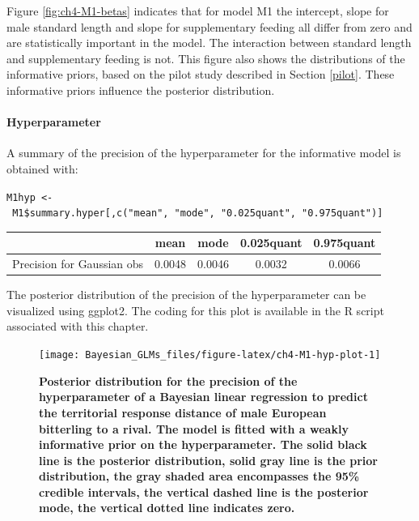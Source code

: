 \documentclass[
]{book}
\begin{document}
Figure \ref{fig:ch4-M1-betas} indicates that for model M1 the intercept, slope for male standard length and slope for supplementary feeding all differ from zero and are statistically important in the model. The interaction between standard length and supplementary feeding is not. This figure also shows the distributions of the informative priors, based on the pilot study described in Section \ref{pilot}. These informative priors influence the posterior distribution.

\hypertarget{hyperparameter-1}{%
\paragraph{Hyperparameter}\label{hyperparameter-1}}

A summary of the precision of the hyperparameter for the informative model is obtained with:

\texttt{M1hyp\ \textless{}-\ M1\$summary.hyper{[},c("mean",\ "mode",\ "0.025quant",\ "0.975quant"){]}}

\begin{longtable}[]{@{}ccccc@{}}
\toprule
& mean & mode & 0.025quant & 0.975quant \\
\midrule
\endhead
Precision for Gaussian obs & 0.0048 & 0.0046 & 0.0032 & 0.0066 \\
\bottomrule
\end{longtable}

The posterior distribution of the precision of the hyperparameter can be visualized using ggplot2. The coding for this plot is available in the R script associated with this chapter.



\begin{figure}

{\centering \texttt{[image: Bayesian\_GLMs\_files/figure-latex/ch4-M1-hyp-plot-1]} 

}

\caption{\textbf{Posterior distribution for the precision of the hyperparameter of a Bayesian linear regression to predict the territorial response distance of male European bitterling to a rival. The model is fitted with a weakly informative prior on the hyperparameter. The solid black line is the posterior distribution, solid gray line is the prior distribution, the gray shaded area encompasses the 95\% credible intervals, the vertical dashed line is the posterior mode, the vertical dotted line indicates zero.}}\label{fig:ch4-M1-hyp-plot}
\end{figure}
\end{document}
